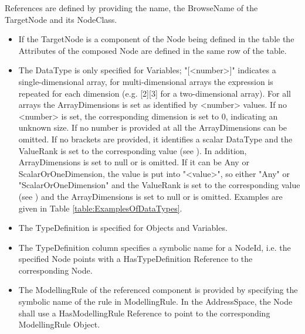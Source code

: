 \glspl{Reference} are defined by providing the  name, the \gls{BrowseName} of the \gls{TargetNode} and its \gls{NodeClass}.

\begin{itemize}
    \item If the \gls{TargetNode} is a component of the \gls{Node} being defined in the table the \glspl{Attribute} of the composed Node are defined in the same row of the table. 
    \item The \gls{DataType} is only specified for Variables; "[<number>]" indicates a single-dimensional array, for multi-dimensional arrays the expression is repeated for each dimension (e.g. [2][3] for a two-dimensional array). For all arrays the \glspl{ArrayDimension} is set as identified by <number> values. If no <number> is set, the corresponding dimension is set to 0, indicating an unknown size. If no number is provided at all the \glspl{ArrayDimension} can be omitted. If no brackets are provided, it identifies a scalar \gls{DataType} and the \gls{ValueRank} is set to the corresponding value (see \cite{UAPart3}). In addition, \glspl{ArrayDimension} is set to null or is omitted. If it can be Any or ScalarOrOneDimension, the value is put into "{<value>}", so either "{Any}" or "{ScalarOrOneDimension}" and the \gls{ValueRank} is set to the corresponding value (see \cite{UAPart3}) and the \glspl{ArrayDimension} is set to null or is omitted. Examples are given in Table \ref{table:ExamplesOfDataTypes}.
    \item The \gls{TypeDefinition} is specified for Objects and Variables.
    \item The \gls{TypeDefinition} column specifies a symbolic name for a \gls{NodeId}, i.e. the specified Node points with a \gls{HasTypeDefinition} Reference to the corresponding Node.
    \item The \gls{ModellingRule} of the referenced component is provided by specifying the symbolic name of the rule in \gls{ModellingRule}. In the \gls{AddressSpace}, the Node shall use a \gls{HasModellingRule} Reference to point to the corresponding \gls{ModellingRule} Object.
\end{itemize}

